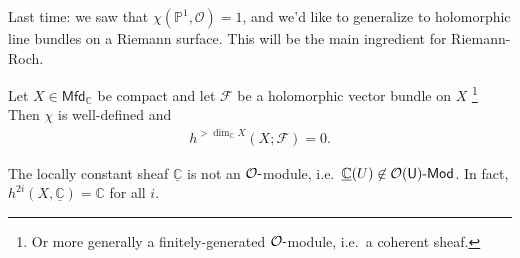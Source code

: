 \begin{remark}

Last time: we saw that \(\chi({\mathbb{P}}^1, {\mathcal{O}}) = 1\), and
we'd like to generalize to holomorphic line bundles on a Riemann
surface. This will be the main ingredient for Riemann-Roch.

\end{remark}

\begin{theorem}[?]

Let \(X \in {\mathsf{Mfd}}_{\mathbb{C}}\) be compact and let
\(\mathcal{F}\) be a holomorphic vector bundle on \(X\) \footnote{Or
  more generally a finitely-generated \({\mathcal{O}}{\hbox{-}}\)module,
  i.e.~a coherent sheaf.} Then \(\chi\) is well-defined and
\begin{align*} h^{> \dim_{\mathbb{C}}X}(X; \mathcal{F} ) = 0.\end{align*}

\end{theorem}

\begin{remark}

The locally constant sheaf \(\underline{{\mathbb{C}}}\) is not an
\({\mathcal{O}}{\hbox{-}}\)module,
i.e.~\(\underline{{\mathbb{C}}}(U) \not\in {\mathsf{{\mathcal{O}}(U)}{\hbox{-}}\mathsf{Mod}}\).
In fact, \(h^{2i}(X, \underline{{\mathbb{C}}}) = {\mathbb{C}}\) for all
\(i\).

\end{remark}

